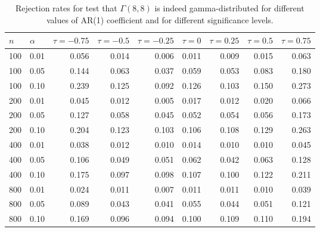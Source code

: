 \begin{table}[ht]
\centering
\caption{Rejection rates for test that $\Gamma(8, 8)$ is 
                   indeed
                   gamma-distributed for
                   different values of AR(1) coefficient and for different 
                   significance levels.} 
\label{table:rr_gamma}
\begin{tabular}{llrrrrrrr}
  \hline
$n$ & $\alpha$ & $\tau = -0.75$ & $\tau = -0.5$ & $\tau = -0.25$ & $\tau = 0$ & $\tau = 0.25$ & $\tau = 0.5$ & $\tau = 0.75$ \\ 
  \hline
100 & 0.01 & 0.056 & 0.014 & 0.006 & 0.011 & 0.009 & 0.015 & 0.063 \\ 
  100 & 0.05 & 0.144 & 0.063 & 0.037 & 0.059 & 0.053 & 0.083 & 0.180 \\ 
  100 & 0.10 & 0.239 & 0.125 & 0.092 & 0.126 & 0.103 & 0.150 & 0.273 \\ 
  200 & 0.01 & 0.045 & 0.012 & 0.005 & 0.017 & 0.012 & 0.020 & 0.066 \\ 
  200 & 0.05 & 0.127 & 0.058 & 0.045 & 0.052 & 0.054 & 0.056 & 0.173 \\ 
  200 & 0.10 & 0.204 & 0.123 & 0.103 & 0.106 & 0.108 & 0.129 & 0.263 \\ 
  400 & 0.01 & 0.038 & 0.012 & 0.010 & 0.014 & 0.010 & 0.010 & 0.045 \\ 
  400 & 0.05 & 0.106 & 0.049 & 0.051 & 0.062 & 0.042 & 0.063 & 0.128 \\ 
  400 & 0.10 & 0.175 & 0.097 & 0.098 & 0.107 & 0.100 & 0.122 & 0.211 \\ 
  800 & 0.01 & 0.024 & 0.011 & 0.007 & 0.011 & 0.011 & 0.010 & 0.039 \\ 
  800 & 0.05 & 0.089 & 0.043 & 0.041 & 0.055 & 0.044 & 0.051 & 0.121 \\ 
  800 & 0.10 & 0.169 & 0.096 & 0.094 & 0.100 & 0.109 & 0.110 & 0.194 \\ 
   \hline
\end{tabular}
\end{table}

